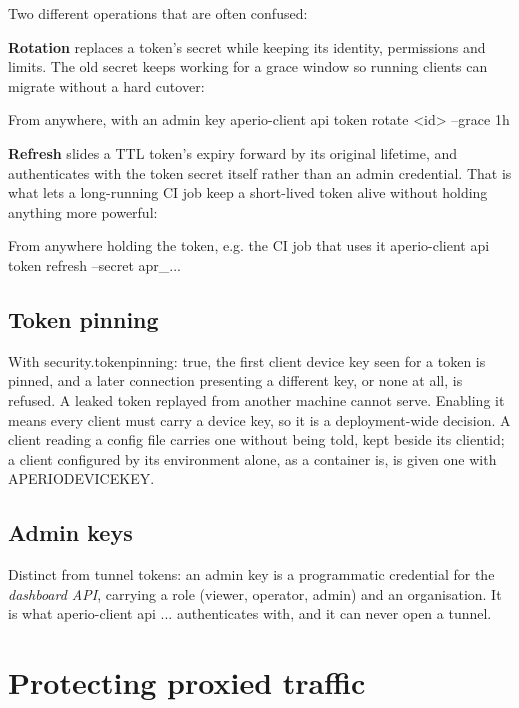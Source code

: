\documentclass[11pt,a4paper,oneside]{book}
\newcommand{\aperiobreakableunderscore}{\textunderscore\allowbreak}
\newcommand{\aperiocodebreaks}{\XeTeXinterchartokenstate=1 }
\newcommand{\aperiocodebreaks}{}
\DeclareRobustCommand{\code}[1]{{\ttfamily\small\aperiocodebreaks
  \let\_\aperiobreakableunderscore#1}}
\begin{document}
Two different operations that are often confused:

\textbf{Rotation} replaces a token's secret while keeping its identity,
permissions and limits. The old secret keeps working for a grace window so
running clients can migrate without a hard cutover:

\begin{codecard}[aperiosh]{From anywhere, with an admin key}
aperio-client api token rotate <id> --grace 1h
\end{codecard}

\textbf{Refresh} slides a TTL token's expiry forward by its original
lifetime, and authenticates with the token secret itself rather than an
admin credential. That is what lets a long-running CI job keep a
short-lived token alive without holding anything more powerful:

\begin{codecard}[aperiosh]{From anywhere holding the token, e.g. the CI job that uses it}
aperio-client api token refresh --secret apr_...
\end{codecard}

\section{Token pinning}

With \code{security.token\_pinning: true}, the first client device key seen for
a token is pinned, and a later connection presenting a different key, or
none at all, is refused. A leaked token replayed from another machine
cannot serve. Enabling it means every client must carry a device key, so
it is a deployment-wide decision. A client reading a config file carries
one without being told, kept beside its \code{client\_id}; a client
configured by its environment alone, as a container is, is given one with
\code{APERIO\_DEVICE\_KEY}.

\section{Admin keys}

Distinct from tunnel tokens: an admin key is a programmatic credential for
the \emph{dashboard API}, carrying a role (viewer, operator, admin) and an
organisation. It is what \code{aperio-client api ...} authenticates with,
and it can never open a tunnel.

\chapter{Protecting proxied traffic}
\label{ch:visitor-auth}
\end{document}
